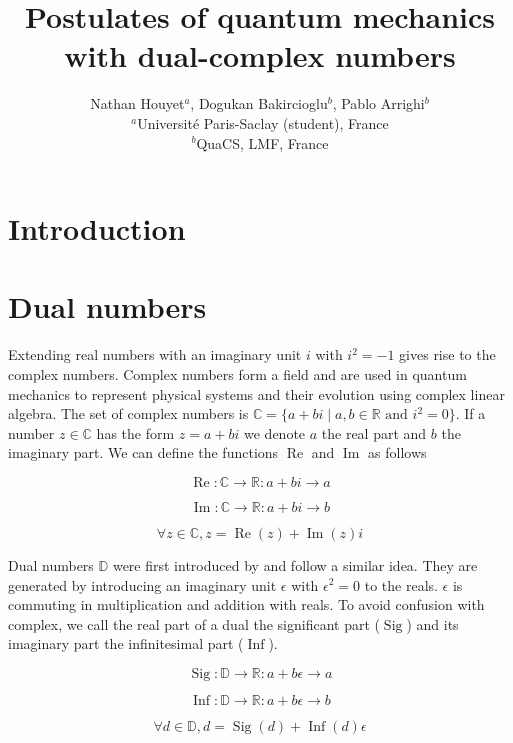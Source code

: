 \documentclass{article}
\title{Postulates of quantum mechanics with dual-complex numbers}
\author{Nathan Houyet$^{a}$, Dogukan Bakircioglu$^{b}$, Pablo Arrighi$^{b}$ \\
        \small $^{a}$Université Paris-Saclay (student), France \\
        \small $^{b}$QuaCS, LMF, France \\
}
\date{}
\newcommand{\R}{\mathbb{R}}
\newcommand{\C}{\mathbb{C}}
\newcommand{\D}{\mathbb{D}}
\newcommand{\e}{\epsilon}
\renewcommand{\Re}{\operatorname{Re}}
\renewcommand{\Im}{\operatorname{Im}}
\newcommand{\Sig}{\operatorname{Sig}}
\newcommand{\Inf}{\operatorname{Inf}}
\begin{document}
\maketitle

\section{Introduction}
\section{Dual numbers}
\noindent Extending real numbers with an imaginary unit $i$ with $i^2 = -1$ gives rise to the complex numbers. Complex numbers form a field and are used in quantum mechanics to represent physical systems and their evolution using complex linear algebra. The set of complex numbers is $\C = \{a + bi \; | \; a, b \in \R \text{ and } i^2 = 0\}$. If a number $z \in \C$ has the form $z = a + bi$ we denote $a$ the real part and $b$ the imaginary part. We can define the functions $\Re$ and $\Im$ as follows
\begin{multicols}{3}
\noindent
\begin{equation}
\Re: \C \to \R: a + bi \to a
\end{equation}

\columnbreak
\noindent
\begin{equation}
\Im: \C \to \R: a + bi \to b
\end{equation}

\columnbreak
\noindent
\begin{equation}
\forall z \in \C, z = \Re(z) + \Im(z)i
\end{equation}

\end{multicols}

Dual numbers $\D$ were first introduced by \cite{clifford1871} and follow a similar idea. They are generated by introducing an imaginary unit $\e$ with $\e^2 = 0$ to the reals. $\e$ is commuting in multiplication and addition with reals. To avoid confusion with complex, we call the real part of a dual the significant part ($\Sig$) and its imaginary part the infinitesimal part ($\Inf$).

\begin{multicols}{3}
\noindent
\begin{equation}
\Sig: \D \to \R: a + b\e \to a
\end{equation}

\columnbreak
\noindent
\begin{equation}
\Inf: \D \to \R: a + b\e \to b
\end{equation}

\columnbreak
\noindent
\begin{equation}
\forall d \in \D, d = \Sig(d) + \Inf(d)\e
\end{equation}

\end{multicols}
\end{document}
